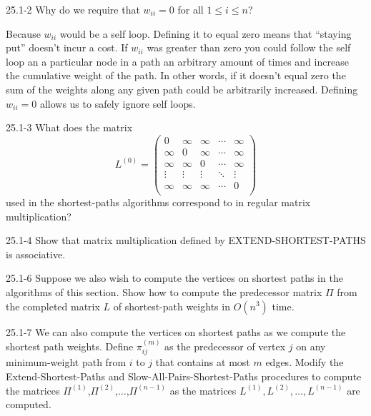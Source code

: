 




\homeworkheader{\classnameandsection}

\begin{problem}{25.1-2}
  Why do we require that $w_{ii} = 0$ for all $1 \le i \le n$?
  \begin{solution}
    Because $w_{ii}$ would be a self loop. Defining it to equal zero means that ``staying put'' doesn't incur a cost. If
    $w_{ii}$ was greater than zero you could follow the self loop an a particular node in a path an arbitrary amount of
    times and increase the cumulative weight of the path.  In other words, if it doesn't equal zero the sum of the
    weights along any given path could be arbitrarily increased. Defining $w_{ii} = 0$ allows us to safely ignore self
    loops.
  \end{solution}
\end{problem}

\begin{problem}{25.1-3}
What does the matrix
\[
 L^{(0)} =
 \begin{pmatrix}
  0 & \infty & \infty & \cdots & \infty\\
  \infty & 0 & \infty & \cdots & \infty\\
  \infty & \infty & 0 & \cdots & \infty\\
  \vdots & \vdots & \vdots & \ddots & \vdots \\
  \infty & \infty & \infty & \cdots & 0 \\
 \end{pmatrix}
\]
used in the shortest-paths algorithms correspond to in regular matrix multiplication?
\end{problem}

\begin{problem}{25.1-4}
  Show that matrix multiplication defined by EXTEND-SHORTEST-PATHS is associative.
\end{problem}

\begin{problem}{25.1-6}
Suppose we also wish to compute the vertices on shortest paths in the algorithms of this section. Show how to compute
the predecessor matrix $\Pi$ from the completed matrix $L$ of shortest-path weights in $O(n^3)$ time.
\end{problem}

\begin{problem}{25.1-7}
  We can also compute the vertices on shortest paths as we compute the shortest path weights.  Define $\pi^{(m)}_{ij}$
  as the predecessor of vertex $j$ on any minimum-weight path from $i$ to $j$ that contains at most $m$ edges.  Modify
  the Extend-Shortest-Paths and Slow-All-Pairs-Shortest-Paths procedures to compute the matrices
  $\Pi^{(1)}$,$\Pi^{(2)}$,$\ldots$,$\Pi^{(n-1)}$ as the matrices $L^{(1)},L^{(2)},\ldots,L^{(n-1)}$ are computed.
\end{problem}


